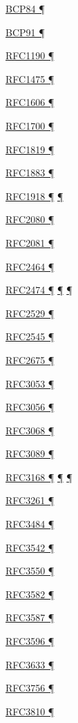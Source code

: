 \documentclass[
]{article}
\begin{document}
\hyperref[multi-prefix-operation]{BCP84 ¶}

\hyperref[dns]{BCP91 ¶}

\hyperref[why-version-6]{RFC1190 ¶}

\hyperref[why-version-6]{RFC1475 ¶}

\hyperref[why-version-6]{RFC1606 ¶}

\hyperref[why-version-6]{RFC1700 ¶}

\hyperref[why-version-6]{RFC1819 ¶}

\hyperref[why-version-6]{RFC1883 ¶}

\hyperref[dual-stack-scenarios]{RFC1918 ¶} \hyperref[tunnels]{¶}

\hyperref[routing]{RFC2080 ¶}

\hyperref[routing]{RFC2081 ¶}

\hyperref[layer-2-functions]{RFC2464 ¶}

\hyperref[packet-format]{RFC2474 ¶}
\hyperref[traffic-class-and-flow-label]{¶}
\hyperref[transport-protocols]{¶}

\hyperref[obsolete-techniques]{RFC2529 ¶}

\hyperref[routing]{RFC2545 ¶}

\hyperref[packet-size-and-jumbo-frames]{RFC2675 ¶}

\hyperref[obsolete-techniques]{RFC3053 ¶}

\hyperref[obsolete-techniques]{RFC3056 ¶}

\hyperref[obsolete-techniques]{RFC3068 ¶}

\hyperref[obsolete-techniques]{RFC3089 ¶}

\hyperref[packet-format]{RFC3168 ¶}
\hyperref[traffic-class-and-flow-label]{¶}
\hyperref[transport-protocols]{¶}

\hyperref[transport-protocols]{RFC3261 ¶}

\hyperref[source-and-destination-address-selection]{RFC3484 ¶}

\hyperref[dual-stack-scenarios]{RFC3542 ¶}

\hyperref[transport-protocols]{RFC3550 ¶}

\hyperref[multihoming]{RFC3582 ¶}

\hyperref[addresses]{RFC3587 ¶}

\hyperref[dns]{RFC3596 ¶}

\hyperref[managed-configuration]{RFC3633 ¶}

\hyperref[layer-2-considerations]{RFC3756 ¶}

\hyperref[address-resolution]{RFC3810 ¶}
\end{document}
